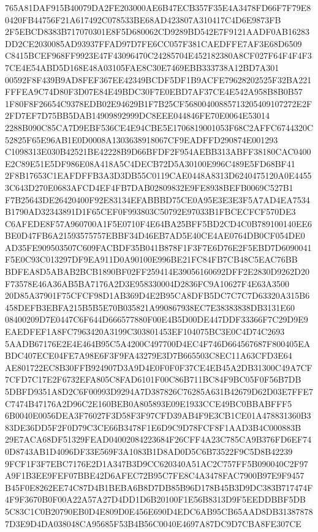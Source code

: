 \documentclass[UTF8,fontset=fandol,zihao=-4,a4paper]{ctexart}
\begin{document}
{{765A81DAF915B40079DA2FE203000AE6B47ECB357F35E4A3478FD66F7F79E80420FB44756F21A617492C078533BE68AD423807A310417C4D6E9873FB
2F5EBCD8383B717070301E8F5D680062CD9289BD542E7F9121AADF0AB16283DD2CE2030085AD93937FFAD97D7FE6CC057F381CAEDFFE7AF3E68D6509
C8415BCEF968FF9923E47F43096470C24285704E452182380A8CF027F64F4F4F37CE4E54ABD5D168E48A03105FAE8C30E7469EBB333738A12BD7A301
00592F8F439B9AD8FEF367EE42349BCDF5DF1B9ACFE79628202525F32BA221FFFEA9C74D80F3D07E84E49BDC30F7E0EBD7AF37CE4E542A958B8B0B57
1F80F8F26654C9378EDB02E94629B1F7B25CF56800400885713205409107272E2F2FD7EF7D75BB5DAB14909892999DC8EEE044846FE70E0064E53014
2288B090C85CA7D9EBF536CE4E94CBE5E1706819001053F68C2AFFC6744320C52825F65E96AB1E0D0008A1303638918067CF9EADFFD290874E001293
C1098313E030B42521BE42228B9D66BFDF2F954AEBB313ABFF38180CAC0400E2C89E51E5DF986E08A418A5C4DECB72D5A30100E996C489E5FD68BF41
2F8B17653C1EAFDFFB3A3D3DB55C0119CAE0448A8313D6240475120A0E44553C643D270E0683AFCD4EF4FB7DAB02809832E9FE8938BEFB0069C527B1
F7B25643DE26420400F92E83134EFABBBD75CE0A95E3E3E3F5A7AD4EA7534B1790AD32343891D1F65CEF0F993803C50792E97033B1FBCECFCF570DE3
C6AFEDE8F57A960700A1F5E0710F4E64BA25BFF5BD2CD4C0B789100140EE6BE0D47FB6A21593575757EBBF34D46EB7AD5E40CE4AE0764DB0CF054DE0
AD35FE909503507C609FACBDF35B041B878F1F3F7E6D76E2F5EBD7D6090041F5E0C93C013297DF9EA911D0A90100E996BE21FC84FB7CB48C5EAC76BB
BDFEA8D5ABAB2BCB1890BF02FF259414E39056160692DFF2E2830D9262D20F73578E46A36AB5BA7176A2D3E958330004D2836FC9A10627F4E63A3500
20D85A37901F75CFCF98D1AB369D4E2B95CA8DFB5DC7C7C7D63320A315B6458DEFB3EBFA215B5B5E70B035821A990867938EC7E38383838DB3131E60
08400209D7E0447C6F644D666577880F00E4B5D00DE447DDF33366F7C29D9E9EAEDFEF1A8FC7963420A3199C303801453EF104075BC3E0C4D74C2693
5AADB67176E2E4E464B95C5A4200C497700D4EC4F746D664567687F800405EABDC407ECE04FE7A98E6F3F9FA43279E3D7B665503C8EC11A63CFD3E64
AE801722EC8B30FFB924907D3A9D4E0F0F0F37CE4EB45A2DB31300C49A7CF7CFD7C17E2F6732EFA805C8FAD6101F00C86B711BC84F9BC05F0F56B7DB
5DBFD9351A8D2C6F00993D9294A7D387826C76285A631B42679D62D03E7FFE7C7474B47176A2D96C2E160BEB0A805893E09E1933CCE49BC0BBABFFF5
6B0040E0056DEA3F76027F3D58F3F97CFD39AB4F9E3CB1CE01A478831360B383DE36DD5F2F0D79C3CE66B3478F1E6D9C9D78FCF8F1AAD3B4C000883B
29E7ACA68DF51329FEAD04002084223684F26CFF4A23C785CA9B376FD6EF740D8743AB1D4096DF33E569F3A1083B1D8AD0D5C6B73522F9C5D8B42239
9FCF1F3F7EBC7176E2D1A347B3D9CC620340A51AC2C757FF5B090040C2F97A9F1B3EE9FEF07BBE42D6AFEC72B95C7FE8C4A3478FAC7900B97E9F9457
B45F0E8262EE74C87D4B1BEBA6B8D7DB85B96D178B45B3D9DC383B717474F4F9F3670B0F00A22A57A27D4DD1D6B20100F1E56B8313D9F5EEDDBBF5DB
5C83C1C0B20790EB0D4E809D0E456E690D4EDC6AB95CB65AAD8DB313878787D3E9D4DA038048CA95685F53B4B56C0040E4697A87DC9D7CBA8FE307CE
}}
\end{document}
